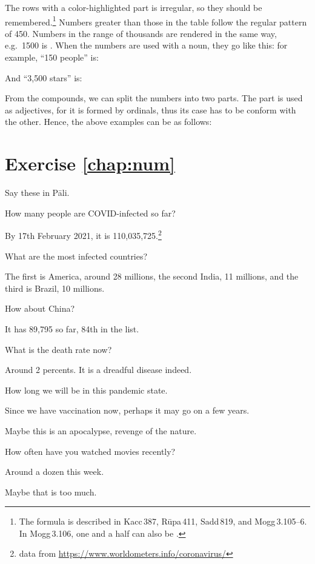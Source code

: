 The rows with a color-highlighted part is irregular, so they should be remembered.\footnote{The formula is described in Kacc\,387, R\=upa\,411, Sadd\,819, and Mogg\,3.105--6. In Mogg\,3.106, one and a half can also be .} Numbers greater than those in the table follow the regular pattern of 450. Numbers in the range of thousands are rendered in the same way, e.g.\ 1500 is . When the numbers are used with a noun, they go like this: for example, ``150 people'' is:


And ``3,500 stars'' is:


From the compounds, we can split the numbers into two parts. The  part is used as adjectives, for it is formed by ordinals, thus its case has to be conform with the other. Hence, the above examples can be as follows:


\section*{Exercise \ref{chap:num}}
Say these in P\=ali.
\begin{compactenum}
\item How many people are COVID-infected so far?
\item By 17th February 2021, it is 110,035,725.\footnote{data from \url{https://www.worldometers.info/coronavirus/}}
\item What are the most infected countries?
\item The first is America, around 28 millions, the second India, 11 millions, and the third is Brazil, 10 millions.
\item How about China?
\item It has 89,795 so far, 84th in the list.
\item What is the death rate now?
\item Around 2 percents. It is a dreadful disease indeed.
\item How long we will be in this pandemic state.
\item Since we have vaccination now, perhaps it may go on a few years.
\item Maybe this is an apocalypse, revenge of the nature.
\item How often have you watched movies recently?
\item Around a dozen this week.
\item Maybe that is too much.
\end{compactenum}
